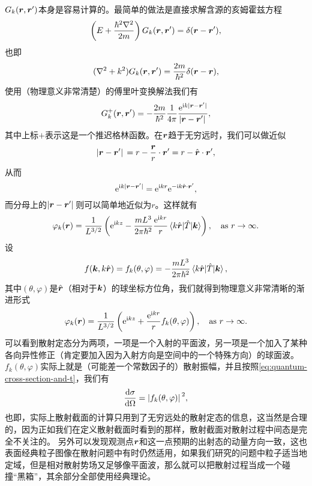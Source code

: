$G_k(\vb*{r}, \vb*{r}')$本身是容易计算的。最简单的做法是直接求解含源的亥姆霍兹方程
\[
    \left(E + \frac{\hbar^2 \laplacian}{2m} \right) G_k(\vb*{r}, \vb*{r}') = \delta(\vb*{r} - \vb*{r}'),
\]
也即
\[
    (\laplacian + k^2) G_k(\vb*{r}, \vb*{r}') = \frac{2m}{\hbar^2} \delta(\vb*{r} - \vb*{r}),
\]
使用（物理意义非常清楚）的傅里叶变换解法我们有
\[
    G_k^+(\vb*{r}, \vb*{r}') = - \frac{2m}{\hbar^2} \frac{1}{4\pi} \frac{\mathrm{e}^{\mathrm{i} k \abs*{\vb*{r} - \vb*{r}'}}}{\abs*{\vb*{r} - \vb*{r}'}},
\]
其中上标$+$表示这是一个推迟格林函数。在$\vb*{r}$趋于无穷远时，我们可以做近似
\[
    \abs*{\vb*{r} - \vb*{r}'} = r - \frac{\vb*{r}}{r} \cdot \vb*{r}' = r - \hat{\vb*{r}} \cdot \vb*{r}',
\]
从而
\[
    \mathrm{e}^{\mathrm{i} k \abs*{\vb*{r} - \vb*{r}'}} = \mathrm{e}^{\mathrm{i} k r} \mathrm{e}^{- \mathrm{i} k \hat{\vb*{r}} \cdot \vb*{r}'},
\]
而分母上的$\abs*{\vb*{r} - \vb*{r}'}$则可以简单地近似为$r$。这样就有
\[
    \varphi_k(\vb*{r}) = \frac{1}{L^{3/2}} \left( \mathrm{e}^{\mathrm{i} k z} - \frac{m L^3}{2\pi \hbar^2} \frac{\mathrm{e}^{\mathrm{i} k r}}{r} \mel{k \hat{\vb*{r}}}{\hat{T}}{\vb*{k}} \right) , \quad \text{as $r \to \infty$}.
\]
设
\begin{equation}
    f(\vb*{k}, k \hat{\vb*{r}}) = f_k(\theta, \varphi) = - \frac{m L^3}{2\pi \hbar^2} \mel{k \hat{\vb*{r}}}{\hat{T}}{\vb*{k}} ,
    \label{eq:scattering-amp}
\end{equation}
其中$(\theta, \varphi)$是$\hat{\vb*{r}}$（相对于$\vb*{k}$）的球坐标方位角，我们就得到物理意义非常清晰的渐进形式
\begin{equation}
    \varphi_k(\vb*{r}) = \frac{1}{L^{3/2}} \left( \mathrm{e}^{\mathrm{i} k z} + \frac{\mathrm{e}^{\mathrm{i} k r}}{r} f_k(\theta, \varphi) \right) , \quad \text{as $r \to \infty$}.
    \label{eq:infty-in-box}
\end{equation}
可以看到散射定态分为两项，一项是一个入射的平面波，另一项是一个加入了某种各向异性修正（肯定要加入因为入射方向是空间中的一个特殊方向）的球面波。$f_k(\theta, \varphi)$实际上就是（可能差一个常数因子的）散射振幅，并且按照\eqref{eq:quantum-cross-section-and-t}，我们有
\begin{equation}
    \dv{\sigma}{\Omega} = \abs*{f_k(\theta, \varphi)}^2,
    \label{eq:quantum-cross-section-and-f}
\end{equation}
也即，实际上散射截面的计算只用到了无穷远处的散射定态的信息，这当然是合理的，因为正如我们在定义散射截面时看到的那样，散射截面对散射过程中间态是完全不关注的。
另外可以发现观测点$\vb*{r}$和这一点预期的出射态的动量方向一致，这也表面经典粒子图像在散射问题中有时仍然适用，如果我们研究的问题中粒子适当地定域，但是相对散射势场又足够像平面波，那么就可以把散射过程当成一个碰撞“黑箱”，其余部分全部使用经典理论。

